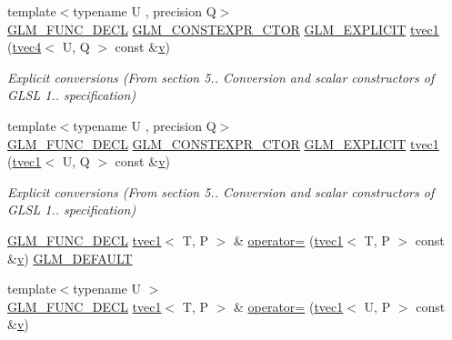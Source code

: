 \begin{DoxyCompactItemize}
{\footnotesize template$<$typename U , precision Q$>$ }\\\mbox{\hyperlink{setup_8hpp_ab2d052de21a70539923e9bcbf6e83a51}{G\+L\+M\+\_\+\+F\+U\+N\+C\+\_\+\+D\+E\+CL}} \mbox{\hyperlink{setup_8hpp_ad34178a09666081abdb573c14d1f4a5a}{G\+L\+M\+\_\+\+C\+O\+N\+S\+T\+E\+X\+P\+R\+\_\+\+C\+T\+OR}} \mbox{\hyperlink{setup_8hpp_a6c74f5a5e7b134ab69023ff9a30d4d5d}{G\+L\+M\+\_\+\+E\+X\+P\+L\+I\+C\+IT}} \mbox{\hyperlink{structglm_1_1tvec1_a9d01781ad635defad3e1fd64f02fda63}{tvec1}} (\mbox{\hyperlink{structglm_1_1tvec4}{tvec4}}$<$ U, Q $>$ const \&\mbox{\hyperlink{glad_8h_a14cfbe2fc2234f5504618905b69d1e06}{v}})
\begin{DoxyCompactList}\small\item\em Explicit conversions (From section 5.. Conversion and scalar constructors of G\+L\+SL 1.. specification) \end{DoxyCompactList}\item 
{\footnotesize template$<$typename U , precision Q$>$ }\\\mbox{\hyperlink{setup_8hpp_ab2d052de21a70539923e9bcbf6e83a51}{G\+L\+M\+\_\+\+F\+U\+N\+C\+\_\+\+D\+E\+CL}} \mbox{\hyperlink{setup_8hpp_ad34178a09666081abdb573c14d1f4a5a}{G\+L\+M\+\_\+\+C\+O\+N\+S\+T\+E\+X\+P\+R\+\_\+\+C\+T\+OR}} \mbox{\hyperlink{setup_8hpp_a6c74f5a5e7b134ab69023ff9a30d4d5d}{G\+L\+M\+\_\+\+E\+X\+P\+L\+I\+C\+IT}} \mbox{\hyperlink{structglm_1_1tvec1_a9122f5419d51e798f0a249e8f0b2433a}{tvec1}} (\mbox{\hyperlink{structglm_1_1tvec1}{tvec1}}$<$ U, Q $>$ const \&\mbox{\hyperlink{glad_8h_a14cfbe2fc2234f5504618905b69d1e06}{v}})
\begin{DoxyCompactList}\small\item\em Explicit conversions (From section 5.. Conversion and scalar constructors of G\+L\+SL 1.. specification) \end{DoxyCompactList}\item 
\mbox{\hyperlink{setup_8hpp_ab2d052de21a70539923e9bcbf6e83a51}{G\+L\+M\+\_\+\+F\+U\+N\+C\+\_\+\+D\+E\+CL}} \mbox{\hyperlink{structglm_1_1tvec1}{tvec1}}$<$ T, P $>$ \& \mbox{\hyperlink{structglm_1_1tvec1_a317f46cddcdf81865c4970004e294055}{operator=}} (\mbox{\hyperlink{structglm_1_1tvec1}{tvec1}}$<$ T, P $>$ const \&\mbox{\hyperlink{glad_8h_a14cfbe2fc2234f5504618905b69d1e06}{v}}) \mbox{\hyperlink{setup_8hpp_aefce7051c376a64ba89fa93a9f63bc2c}{G\+L\+M\+\_\+\+D\+E\+F\+A\+U\+LT}}
\item 
{\footnotesize template$<$typename U $>$ }\\\mbox{\hyperlink{setup_8hpp_ab2d052de21a70539923e9bcbf6e83a51}{G\+L\+M\+\_\+\+F\+U\+N\+C\+\_\+\+D\+E\+CL}} \mbox{\hyperlink{structglm_1_1tvec1}{tvec1}}$<$ T, P $>$ \& \mbox{\hyperlink{structglm_1_1tvec1_a472b0f4afb1f9efd1769597027a399f0}{operator=}} (\mbox{\hyperlink{structglm_1_1tvec1}{tvec1}}$<$ U, P $>$ const \&\mbox{\hyperlink{glad_8h_a14cfbe2fc2234f5504618905b69d1e06}{v}})

\end{DoxyCompactItemize}
